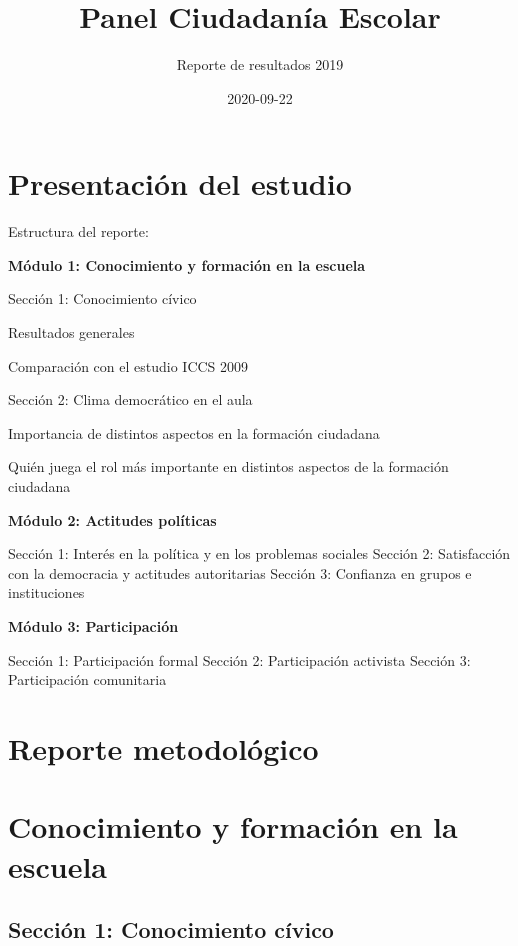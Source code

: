 \documentclass[
  14pt,
]{book}
\title{Panel Ciudadanía Escolar}
\subtitle{Reporte de resultados 2019}
\author{}
\date{\vspace{-2.5em}2020-09-22}
\begin{document}
\maketitle

{
\setcounter{tocdepth}{1}
\tableofcontents
}
\hypertarget{presentaciuxf3n-del-estudio}{%
\chapter*{Presentación del estudio}\label{presentaciuxf3n-del-estudio}}

Estructura del reporte:

\textbf{Módulo 1: Conocimiento y formación en la escuela}

Sección 1: Conocimiento cívico

Resultados generales

Comparación con el estudio ICCS 2009

Sección 2: Clima democrático en el aula

Importancia de distintos aspectos en la formación ciudadana

Quién juega el rol más importante en distintos aspectos de la formación ciudadana

\textbf{Módulo 2: Actitudes políticas}

Sección 1: Interés en la política y en los problemas sociales
Sección 2: Satisfacción con la democracia y actitudes autoritarias
Sección 3: Confianza en grupos e instituciones

\textbf{Módulo 3: Participación}

Sección 1: Participación formal
Sección 2: Participación activista
Sección 3: Participación comunitaria

\hypertarget{reporte-metodoluxf3gico}{%
\chapter*{Reporte metodológico}\label{reporte-metodoluxf3gico}}

\hypertarget{conocimiento-y-formaciuxf3n-en-la-escuela}{%
\chapter{Conocimiento y formación en la escuela}\label{conocimiento-y-formaciuxf3n-en-la-escuela}}

\hypertarget{secciuxf3n-1-conocimiento-cuxedvico}{%
\section{Sección 1: Conocimiento cívico}\label{secciuxf3n-1-conocimiento-cuxedvico}}
\end{document}
